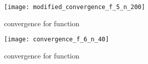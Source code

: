 \begin{figure}
		\texttt{[image: modified\_convergence\_f\_5\_n\_200]}
		\caption{ convergence for function }
\end{figure}

\begin{figure}
		\texttt{[image: convergence\_f\_6\_n\_40]}
		\caption{ convergence for function }
\end{figure}
\newpage